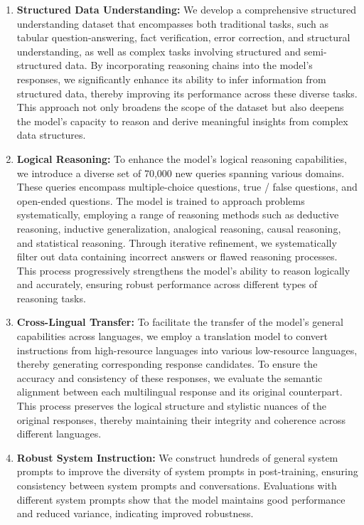 \begin{enumerate}[label=(\arabic*)]
    \item \textbf{Structured Data Understanding: } 
    We develop a comprehensive structured understanding dataset that encompasses both traditional tasks, such as tabular question-answering, fact verification, error correction, and structural understanding, as well as complex tasks involving structured and semi-structured data. By incorporating reasoning chains into the model's responses, we significantly enhance its ability to infer information from structured data, thereby improving its performance across these diverse tasks. This approach not only broadens the scope of the dataset but also deepens the model's capacity to reason and derive meaningful insights from complex data structures.

    \item \textbf{Logical Reasoning:} To enhance the model's logical reasoning capabilities, we introduce a diverse set of 70,000 new queries spanning various domains. These queries encompass multiple-choice questions, true / false questions, and open-ended questions. 
    The model is trained to approach problems systematically, employing a range of reasoning methods such as deductive reasoning, inductive generalization, analogical reasoning, causal reasoning, and statistical reasoning. Through iterative refinement, we systematically filter out data containing incorrect answers or flawed reasoning processes. This process progressively strengthens the model's ability to reason logically and accurately, ensuring robust performance across different types of reasoning tasks.
    
    \item \textbf{Cross-Lingual Transfer:} To facilitate the transfer of the model's general capabilities across languages, we employ a translation model to convert instructions from high-resource languages into various low-resource languages, thereby generating corresponding response candidates. To ensure the accuracy and consistency of these responses, we evaluate the semantic alignment between each multilingual response and its original counterpart. This process preserves the logical structure and stylistic nuances of the original responses, thereby maintaining their integrity and coherence across different languages.
    
    \item \textbf{Robust System Instruction:}  We construct hundreds of general system prompts to improve the diversity of system prompts in post-training, ensuring consistency between system prompts and conversations. Evaluations with different system prompts show that the model maintains good performance~\citep{lu2024large} and reduced variance, indicating improved robustness.
    

\end{enumerate}
